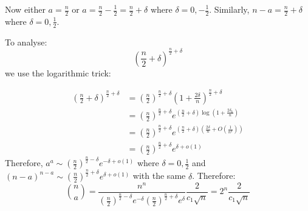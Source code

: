 \documentclass[]{article}
\theoremstyle{definition}
\numberwithin{theorem}{section}
\numberwithin{equation}{section}
\begin{document}
Now either $a = \frac{n}{2}$ or $a = \frac{n}{2} - \frac{1}{2} = \frac{n}{2} + \delta$ where $\delta = 0, -\frac{1}{2}$. 
Similarly, $n - a = \frac{n}{2} + \delta$ where $\delta = 0, \frac{1}{2}$.

To analyse:
\begin{equation}
	\left(\frac{n}{2} + \delta\right)^{\frac{n}{2} + \delta}
\end{equation}
we use the logarithmic trick:

\begin{align*}
	\left(\frac{n}{2} + \delta\right)^{\frac{n}{2} + \delta} &= \left(\frac{n}{2} \right)^{\frac{n}{2} + \delta}\left(1 + \frac{2 \delta }{n}\right)^{\frac{n}{2} + \delta}\\
	&= \left(\frac{n}{2} \right)^{\frac{n}{2} + \delta} e^{\left(\frac{n}{2} + \delta\right) \log( 1 + \frac{2 \delta_k}{n})}\\
	&= \left(\frac{n}{2} \right)^{\frac{n}{2} + \delta}e^{\left(\frac{n}{2} + \delta\right)\left(\frac{2\delta}{n} + O\left(\frac{1}{n^2}\right)\right)}\\
	&= 	\left(\frac{n}{2} \right)^{\frac{n}{2} + \delta}e^{\delta + o(1)}
\end{align*}
	Therefore, $a^a \sim  \left(\frac{n}{2} \right)^{\frac{n}{2} - \delta}e^{-\delta + o(1)}$ where $\delta = 0 , \frac{1}{2}$ and 
	$(n - a)^{n - a} \sim \left(\frac{n}{2} \right)^{\frac{n}{2} + \delta}e^{\delta + o(1)}$ with the same $\delta$.
	Therefore:
	\begin{equation}
		\binom{n}{a} = \frac{n^n}{\left(\frac{n}{2} \right)^{\frac{n}{2} - \delta}e^{-\delta} \left(\frac{n}{2} \right)^{\frac{n}{2} + \delta}e^{\delta}}\frac{2}{c_1 \sqrt{n}} = 2^n \frac{2}{c_1 \sqrt{n}}
	\end{equation}
	
\end{document}
